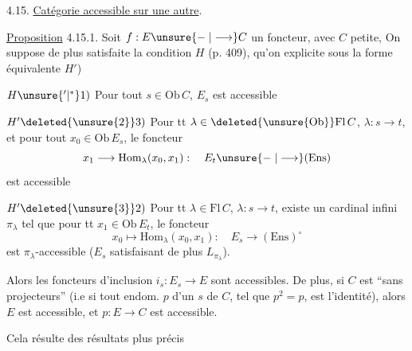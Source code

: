 4.15. \uline{Catégorie accessible sur une autre}.

\uline{Proposition} 4.15.1. Soit $f:E\unsure{\relbar|\longrightarrow} C$ un foncteur, avec $C$  petite,  On suppose de plus satisfaite la condition $H$ (p. 409), qu'on explicite  sous la forme équivalente $H'$)

$H\unsure{'|^{*}}1)$ Pour tout $s\in\mathrm{Ob}\,C$, $E_s$ est accessible

$H'\deleted{\unsure{2}}3)$ Pour tt $\lambda\in\deleted{\unsure{\mathrm{Ob}}}\mathrm{Fl}\,C$, $\lambda:s\to t$, et pour tout $x_0\in\mathrm{Ob}\,E_s$, le foncteur
\[x_1\longrightarrow\mathrm{Hom}_{\lambda}(x_0,x_1):\quad E_t\unsure{\relbar|\longrightarrow}(\mathrm{Ens})\]
est accessible


$H'\deleted{\unsure{3}}2)$ Pour tt $\lambda\in\mathrm{Fl}\,C$, $\lambda:s\to t$, existe un cardinal infini $\pi_\lambda$ tel que pour tt $x_1\in\mathrm{Ob}\,E_t$, le foncteur
\[x_0\longmapsto\mathrm{Hom}_{\lambda}(x_0,x_1):\quad E_s\longrightarrow(\mathrm{Ens})^\circ\]
est $\pi_\lambda$-accessible ($E_s$ satisfaisant de plus  $L_{\pi_\lambda}$).

Alors  les foncteurs d'inclusion $i_s:E_s\longrightarrow E$ sont accessibles. De plus, si $C$ est ``sans projecteurs'' (i.e si tout endom. $p$ d'un  $s$ de $C$, tel que $p^2=p$, est l'identité), alors $E$ est accessible, et $p:E\to C$ est accessible.

Cela résulte des résultats plus précis


